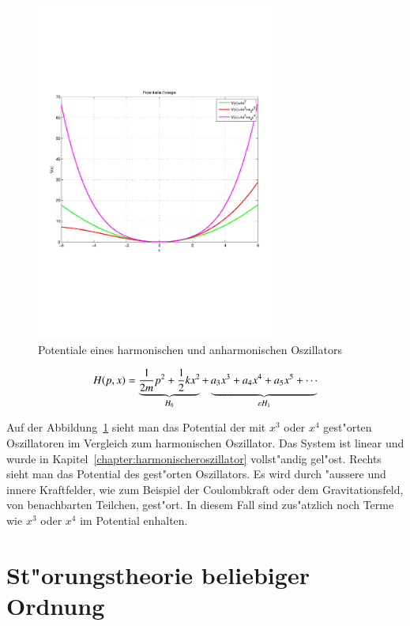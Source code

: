 \begin{refsection}
\begin{figure}	%
\centering
\includegraphics[width=0.7\textwidth]{anharmonisch/images/Potential.pdf}
\caption{Potentiale eines harmonischen und anharmonischen Oszillators
\label{skript:Potentiale}}
\end{figure}

\[
H(p,x)
=
\underbrace{\frac1{2m}p^2+\frac12 kx^2}_{H_0}
+
\underbrace{\vphantom{\frac1{2m}p^2+\frac12 kx^2}
a_3 x^3+a_4 x^4+a_5 x^5+\dotsb}_{\varepsilon H_1}
\]

Auf der Abbildung~\ref{skript:Potentiale} sieht man das Potential der mit
$x^3$ oder $x^4$ gest"orten Oszillatoren im Vergleich zum harmonischen Oszillator.
Das System ist linear und wurde in
Kapitel~\ref{chapter:harmonischeroszillator} vollst"andig gel"ost.
Rechts sieht man das Potential des gest"orten Oszillators.
Es wird durch "aussere und innere Kraftfelder,
wie zum Beispiel der Coulombkraft oder dem Gravitationsfeld, von benachbarten
Teilchen, gest"ort.
In diesem Fall sind zus"atzlich noch Terme wie $x^3$ oder $x^4$ im Potential enhalten.

\section{St"orungstheorie beliebiger Ordnung}


\end{refsection}
